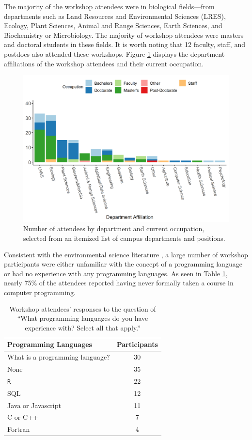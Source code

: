 \documentclass[12pt]{article}
\begin{document}
\quad The majority of the workshop attendees were in biological fields---from departments such as Land Resources and Environmental Sciences (LRES), Ecology, Plant Sciences, Animal and Range Sciences, Earth Sciences, and Biochemistry or Microbiology. The majority of workshop attendees were masters and doctoral students in these fields. It is worth noting that 12 faculty, staff, and postdocs also attended these workshops. Figure \ref{fig:departments} displays the department affiliations of the workshop attendees and their current occupation. 

{
\begin{figure}[h!]
\centering
\includegraphics[width = \textwidth]{images/better_colors_attendance.png}
\caption{Number of attendees by department and current occupation, selected from an itemized list of campus departments and positions.}
    \label{fig:departments}
\end{figure}
}

\quad Consistent with the environmental science literature \citep{andelman, hampton, hernandez, datacarpentry}, a large number of workshop participants were either unfamiliar with the concept of a programming language or had no experience with any programming languages. As seen in Table \ref{tab:programming}, nearly 75\% of the attendees reported having never formally taken a course in computer programming.    \\

{
\begin{table}[h!]
    \centering
    \begin{tabular}{lc}
\hline
Programming Languages & Participants \\
\hline
What is a programming language? & 30 \\
None & 35 \\
\texttt{R} & 22 \\
SQL & 12 \\
Java or Javascript & 11 \\
C or C++ & 7 \\
Fortran & 4 \\
\hline
\end{tabular}
\caption{Workshop attendees' responses to the question of ``What programming languages do you have experience with? Select all that apply.''}
    \label{tab:programming}
\end{table}
}
\end{document}
